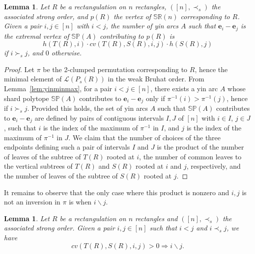 \documentclass{amsart}
\newtheorem{lemma}[theorem]{Lemma}
\theoremstyle{definition}
\renewcommand{\implies}{\Rightarrow} %
\newcommand{\polytope}[1]{\mathds{#1}} %
\newcommand{\SRP}{\polytope{SR}} %
\newcommand{\SP}{\polytope{SP}}
\begin{document}
\begin{lemma}
  Let $R$ be a rectangulation on $n$ rectangles, $([n],\prec_s)$ the associated strong order, and $p(R)$ the vertex of $\SRP(n)$ corresponding to $R$.
  Given a pair $i,j\in [n]$ with $i<j$, the number of yin arcs $A$ such that $\mathbf{e}_i-\mathbf{e}_j$
  is the extremal vertex of $\SP(A)$ contributing to $p(R)$ is
  \[
    h(T(R), i) \cdot cv (T(R), S(R), i, j)\cdot h(S(R), j) 
  \]
  if $i\succ_s j$, and $0$ otherwise.
\end{lemma}
\begin{proof}
  Let $\pi$ be the 2-clumped permutation corresponding to $R$, hence the minimal element of $\mathcal{L}(P_s(R))$ in the weak Bruhat order.
  From Lemma~\ref{lem:yinminmax}, for a pair $i<j \in [n]$, there exists a yin arc $A$ whose shard polytope $\SP(A)$ contributes to $\mathbf{e}_i-\mathbf{e}_j$ only if
  $\pi^{-1}(i)>\pi^{-1}(j)$, hence if $i\succ_s j$.
  Provided this holds, the set of yin arcs $A$ such that $\SP(A)$ contributes to $\mathbf{e}_i-\mathbf{e}_j$ are defined by pairs of contiguous intervals $I,J$ of $[n]$ with $i\in I$, $j\in J$, such that $i$ is the index of the maximum of $\pi^{-1}$ in $I$, and $j$ is the index of the maximum of $\pi^{-1}$ in $J$.
  We claim that the number of choices of the three endpoints defining such a pair of intervals $I$ and $J$ is the product of the
  number of leaves of the subtree of $T(R)$ rooted at $i$, the number of common leaves to the vertical subtrees of $T(R)$ and $S(R)$ rooted
  at $i$ and $j$, respectively, and the number of leaves of the subtree of $S(R)$ rooted at $j$.
\end{proof}

It remains to observe that the only case where this product is nonzero and $i,j$ is not an inversion in $\pi$ is when $i\backslash j$.

\begin{lemma}
  Let $R$ be a rectangulation on $n$ rectangles and $([n],\prec_s)$ the associated strong order.
  Given a pair $i,j\in [n]$ such that $i<j$ and $i\prec_s j$, we have
  \[
    cv (T(R), S(R), i, j) > 0 \implies i\backslash j.
  \]
\end{lemma}



{}


\label{sec:biblio}
\end{document}
